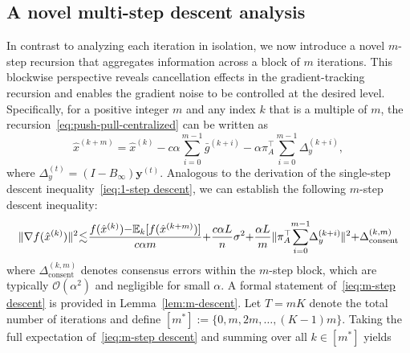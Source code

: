 \documentclass[10pt]{article}
\newcommand{\EE}{\mathbb{E}}
\newcommand{\norm}[1]{\| #1 \|}
\begin{document}
\subsection{A novel multi-step descent analysis} 
In contrast to analyzing each iteration in isolation, we now introduce a novel $m$-step recursion that aggregates information across a block of $m$ iterations. This blockwise perspective reveals cancellation effects in the gradient-tracking recursion and enables the gradient noise to be controlled at the desired level. Specifically, for a positive integer $m$ and any index $k$ that is a multiple of $m$, the recursion~\eqref{eq:push-pull-centralized} can be written as
\begin{equation}\label{eq:m-step recursion}
\hat{x}^{(k+m)}=\hat{x}^{(k)} - c\alpha \sum_{i=0}^{m-1}\bar{g}^{(k+i)} - \alpha \pi_A^\top \sum_{i=0}^{m-1}\Delta_y^{(k+i)},
\end{equation}
where $\Delta_y^{(t)} = (I - B_\infty)\mathbf{y}^{(t)}$. Analogous to the derivation of the single-step descent inequality~\eqref{ieq:1-step descent}, we can establish the following $m$-step descent inequality:
\begin{align}\label{ieq:m-step descent}
    \norm{\nabla f(\hat{x}^{(k)})}^2 
    \hspace{-0.8mm}\lesssim\hspace{-0.8mm} \frac{f(\hat{x}^{(k)}) \hspace{-0.8mm}-\hspace{-0.8mm} \EE_k[f(\hat{x}^{(k+m)})]}{c\alpha m} \hspace{-0.8mm}+\hspace{-0.8mm} \frac{c\alpha L}{n}\sigma^2 \hspace{-0.8mm}+\hspace{-0.8mm} \frac{\alpha L}{m} \norm{\pi_A^\top \hspace{-0.8mm} \sum_{i=0}^{m-1}\hspace{-1mm}\Delta_y^{(k+i)}\hspace{-0.2mm} }^2 \hspace{-0.8mm}+\hspace{-0.8mm} \Delta_{\text{consent}}^{(k,m)}
\end{align}
where $\Delta_{\text{consent}}^{(k,m)}$ denotes consensus errors within the $m$-step block, which are typically $\mathcal{O}(\alpha^2)$ and negligible for small $\alpha$. A formal statement of~\eqref{ieq:m-step descent} is provided in Lemma~\ref{lem:m-descent}. Let $T=mK$ denote the total number of iterations and define $[m^*] := \{0,m,2m,\ldots,(K-1)m\}$. Taking the full expectation of~\eqref{ieq:m-step descent} and summing over all $k \in [m^*]$ yields
\end{document}
